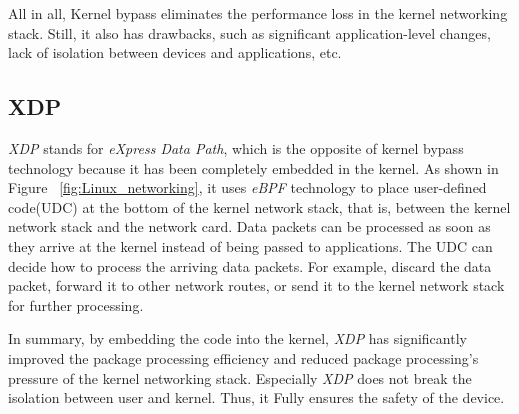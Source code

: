 All in all, Kernel bypass eliminates the performance 
loss in the kernel networking stack. Still, it also has 
drawbacks, such as significant application-level changes, 
lack of isolation between devices and applications, etc.

\subsection{XDP}
\emph{XDP}\cite{10.1145/3281411.3281443} stands for \emph{eXpress Data Path}, which is the opposite of 
kernel bypass technology because it has been completely embedded 
in the kernel. As shown in Figure ~\ref{fig:Linux_networking}, 
it uses \emph{eBPF} technology to place user-defined code(UDC) at the 
bottom of the kernel network stack, that is, between the kernel 
network stack and the network card. 
Data packets can be processed as soon as they arrive at the kernel 
instead of being passed to applications. The UDC can decide how to 
process the arriving data packets. For example, 
discard the data packet, forward it to other network 
routes, or send it to the kernel network stack for further processing.

In summary, by embedding the code into the kernel, 
\emph{XDP} has significantly improved the package processing 
efficiency and reduced package processing's pressure 
of the kernel networking stack. Especially \emph{XDP} does not break the isolation 
between user and kernel. Thus, it Fully ensures the safety of the device.

\cleardoublepage

